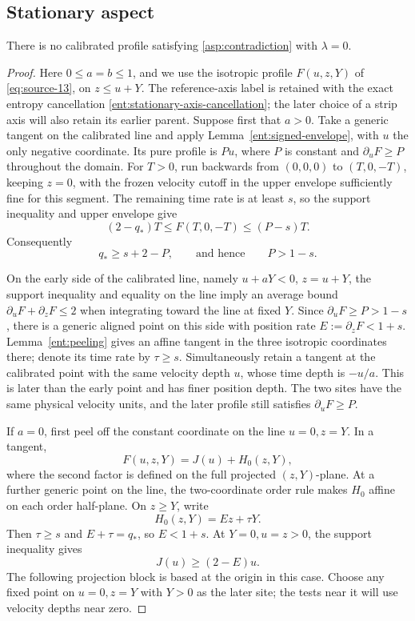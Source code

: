 \subsection{Stationary aspect}

\begin{proposition}\label{asp:stationary}
There is no calibrated profile satisfying \eqref{asp:contradiction} with
\(\lambda=0\).
\end{proposition}

\begin{proof}
Here \(0\le a=b\le1\), and we use the isotropic profile
\(F(u,z,Y)\) of \eqref{eq:source-13}, on \(z\le u+Y\).
The reference-axis label is retained with the exact entropy
cancellation \eqref{ent:stationary-axis-cancellation}; the later
choice of a strip axis will also retain its earlier parent.
Suppose first that \(a>0\). Take a generic tangent on the calibrated line and
apply Lemma~\ref{ent:signed-envelope}, with \(u\) the only negative coordinate.
Its pure profile is \(Pu\), where \(P\) is constant and
\(\partial_uF\ge P\) throughout the domain. For \(T>0\), run backwards
from \((0,0,0)\) to \((T,0,-T)\), keeping \(z=0\), with the frozen
velocity cutoff in the upper envelope sufficiently fine for this
segment. The remaining time rate is at least \(s\), so the support
inequality and upper envelope give
\[
(2-q_*)T\le F(T,0,-T)\le(P-s)T.
\]
Consequently
\[
q_*\ge s+2-P,
\qquad\text{and hence}\qquad P>1-s.
\]

On the early side of the calibrated line, namely
\(u+aY<0\), \(z=u+Y\), the support inequality and equality on the line imply
an average bound \(\partial_uF+\partial_zF\le2\) when integrating toward
the line at fixed \(Y\). Since \(\partial_uF\ge P>1-s\), there is a generic
aligned point on this side with position rate
\(E:=\partial_zF<1+s\). Lemma~\ref{ent:peeling} gives an affine tangent in
the three isotropic coordinates there; denote its time rate by
\(\tau\ge s\). Simultaneously retain a tangent at the calibrated point with
the same velocity depth \(u\), whose time depth is \(-u/a\). This is later
than the early point and has finer position depth. The two sites have the
same physical velocity units, and the later profile still satisfies
\(\partial_uF\ge P\).

If \(a=0\), first peel off the constant coordinate on the line
\(u=0,z=Y\). In a tangent,
\[
F(u,z,Y)=J(u)+H_0(z,Y),
\]
where the second factor is defined on the full projected \((z,Y)\)-plane.
At a further generic point on the line, the two-coordinate order rule makes
\(H_0\) affine on each order half-plane. On \(z\ge Y\), write
\[
H_0(z,Y)=Ez+\tau Y.
\]
Then \(\tau\ge s\) and \(E+\tau=q_*\), so \(E<1+s\).
At \(Y=0,u=z>0\), the support inequality gives
\begin{equation}\label{asp:J-prefix}
J(u)\ge(2-E)u.
\end{equation}
The following projection block is based at the origin in this case.
Choose any fixed point on \(u=0,z=Y\) with \(Y>0\) as the later site;
the tests near it will use velocity depths near zero.


\end{proof}
